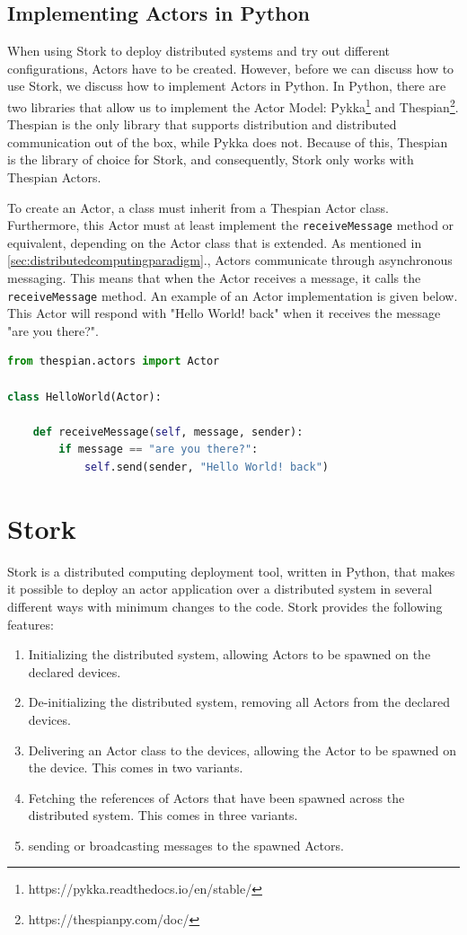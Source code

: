 \documentclass[a4paper]{article}
\newcommand{\secref}[1]{\autoref{#1}.}
\begin{document}
\subsection{Implementing Actors in Python}
When using Stork to deploy distributed systems and try out different configurations, Actors have to be created. However, before we can discuss how to use Stork, we discuss how to implement Actors in Python. In Python, there are two libraries that allow us to implement the Actor Model: Pykka\footnote{https://pykka.readthedocs.io/en/stable/} and Thespian\footnote{https://thespianpy.com/doc/}. Thespian is the only library that supports distribution and distributed communication out of the box, while Pykka does not. Because of this, Thespian is the library of choice for Stork, and consequently, Stork only works with Thespian Actors.

To create an Actor, a class must inherit from a Thespian Actor class. Furthermore, this Actor must at least implement the \lstinline{receiveMessage} method or equivalent, depending on the Actor class that is extended. As mentioned in \secref{sec:distributedcomputingparadigm}, Actors communicate through asynchronous messaging. This means that when the Actor receives a message, it calls the \lstinline{receiveMessage} method. An example of an Actor implementation is given below. This Actor will respond with "Hello World! back" when it receives the message "are you there?".
\begin{lstlisting}[language=Python, caption=Actor example, label=lst:actor]
from thespian.actors import Actor

class HelloWorld(Actor):

    def receiveMessage(self, message, sender):
        if message == "are you there?":
            self.send(sender, "Hello World! back")
\end{lstlisting}
\section{Stork}
Stork is a distributed computing deployment tool, written in Python, that makes it possible to deploy an actor application over a distributed system in several different ways with minimum changes to the code. Stork provides the following features:
\begin{enumerate}
    \item Initializing the distributed system, allowing Actors to be spawned on the declared devices.
    \item De-initializing the distributed system, removing all Actors from the declared devices.
    \item Delivering an Actor class to the devices, allowing the Actor to be spawned on the device. This comes in two variants.
    \item Fetching the references of Actors that have been spawned across the distributed system. This comes in three variants.
    \item sending or broadcasting messages to the spawned Actors.
\end{enumerate}
\end{document}
